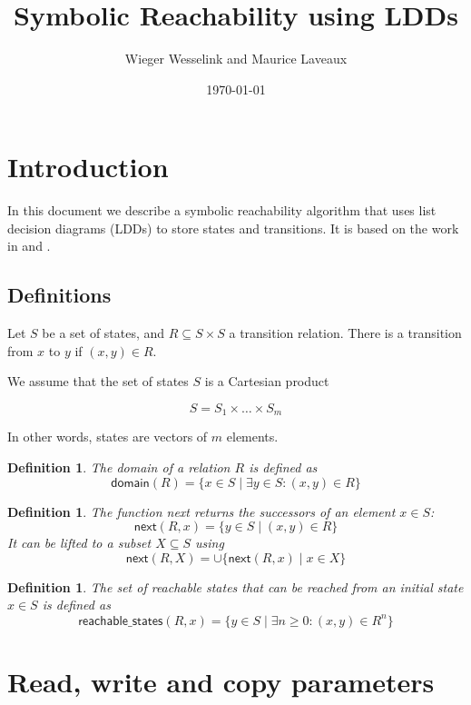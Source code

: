 \documentclass{article}
\title{Symbolic Reachability using LDDs}
\author{Wieger Wesselink and Maurice Laveaux}
\date{\today}
\newtheorem{definition}[theorem]{Definition}
\begin{document}
\maketitle

\section{Introduction}
In this document we describe a symbolic reachability algorithm that uses list decision diagrams (LDDs) to store states and transitions.
It is based on the work in \cite{MeijerBlomPol2008} and \cite{Meijer2019}.

\subsection{Definitions}
Let $S$ be a set of states, and $R \subseteq S \times S$ a transition relation. There is a transition from $x$ to $y$ if $(x,y) \in R$.

\noindent
We assume that the set of states $S$ is a Cartesian product

\[
S = S_1 \times \ldots \times S_m
\]

\noindent
In other words, states are vectors of $m$ elements. \\

\begin{definition}
The domain of a relation $R$ is defined as
\[
\textsf{domain}(R) = \{ x \in S \mid \exists y \in S:  (x,y) \in R \}
\]
\end{definition}

\begin{definition}
The function \textsf{next} returns the successors of an element $x \in S$:
\[
\textsf{next}(R, x) = \{ y \in S \mid (x,y) \in R \}
\]
It can be lifted to a subset $X \subseteq S$ using
\[
\textsf{next}(R, X) = \cup \{ \textsf{next}(R, x) \mid x \in X \}
\]
\end{definition}

\begin{definition}
The set of reachable states that can be reached from an initial state $x \in S$ is defined as
\[
    \textsf{reachable\_states}(R, x) = \{ y \in S \mid \exists n \geq 0: (x, y) \in R^n \}
\]
\end{definition}

\section{Read, write and copy parameters}
\end{document}
